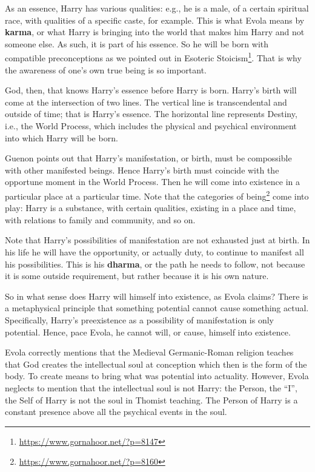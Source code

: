 As an essence, Harry has various qualities: e.g., he is a male, of a certain spiritual race, with qualities of a specific caste, for example. This is what Evola means by \textbf{karma}, or what Harry is bringing into the world that makes him Harry and not someone else. As such, it is part of his essence. So he will be born with compatible preconceptions as we pointed out in Esoteric Stoicism\footnote{\url{https://www.gornahoor.net/?p=8147}}. That is why the awareness of one's own true being is so important.

God, then, that knows Harry's essence before Harry is born. Harry's birth will come at the intersection of two lines. The vertical line is transcendental and outside of time; that is Harry's essence. The horizontal line represents Destiny, i.e., the World Process, which includes the physical and psychical environment into which Harry will be born.

Guenon points out that Harry's manifestation, or birth, must be compossible with other manifested beings. Hence Harry's birth must coincide with the opportune moment in the World Process. Then he will come into existence in a particular place at a particular time. Note that the categories of being\footnote{\url{https://www.gornahoor.net/?p=8160}} come into play: Harry is a substance, with certain qualities, existing in a place and time, with relations to family and community, and so on.

Note that Harry's possibilities of manifestation are not exhausted just at birth. In his life he will have the opportunity, or actually duty, to continue to manifest all his possibilities. This is his \textbf{dharma}, or the path he needs to follow, not because it is some outside requirement, but rather because it is his own nature.

So in what sense does Harry will himself into existence, as Evola claims? There is a metaphysical principle that something potential cannot cause something actual. Specifically, Harry's preexistence as a possibility of manifestation is only potential. Hence, pace Evola, he cannot will, or cause, himself into existence.

Evola correctly mentions that the Medieval Germanic-Roman religion teaches that God creates the intellectual soul at conception which then is the form of the body. To create means to bring what was potential into actuality. However, Evola neglects to mention that the intellectual soul is not Harry: the Person, the ``I'', the Self of Harry is not the soul in Thomist teaching. The Person of Harry is a constant presence above all the psychical events in the soul.

